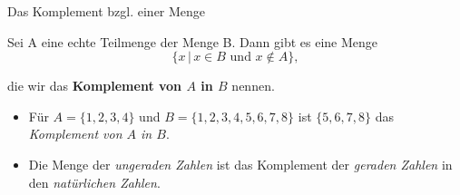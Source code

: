 \documentclass[12pt,ngerman,a4paper,ignorenonframetext,]{beamer}
\providecommand{\tightlist}{%
  \setlength{\itemsep}{0pt}\setlength{\parskip}{0pt}}
\begin{document}
\begin{frame}{Das Komplement bzgl. einer Menge}
\protect\hypertarget{das-komplement-bzgl.-einer-menge}{}


\begin{definition}

Sei A eine echte Teilmenge der Menge B. Dann gibt es eine Menge\\
\begin{equation*}
        \{ x \, | \, x \in B \text{ und } x \notin A\},
\end{equation*}

die wir das \textbf{Komplement von \(A\) in \(B\)} nennen.

\end{definition}


\begin{Beispiele}[]

\begin{itemize}
\tightlist
\item
  Für \(A=\{1,2,3,4\}\) und \(B=\{1,2,3,4,5,6,7,8\}\) ist
  \(\{5,6,7,8\}\) das \emph{Komplement von \(A\) in \(B\)}.
\item
  Die Menge der \emph{ungeraden Zahlen} ist das Komplement der
  \emph{geraden Zahlen} in den \emph{natürlichen Zahlen}.
\end{itemize}

\end{Beispiele}

\end{frame}
\end{document}
